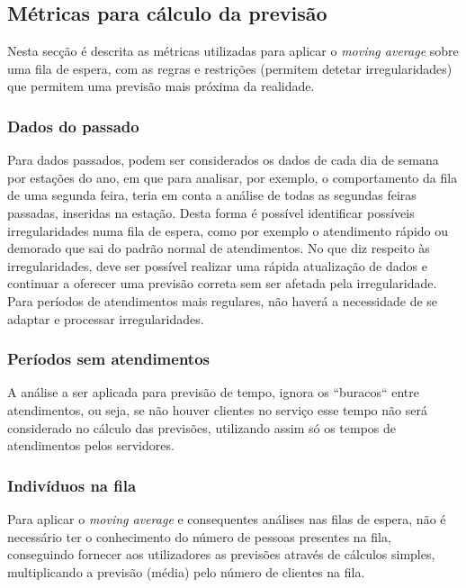 \subsection{Métricas para cálculo da previsão}

Nesta secção é descrita as métricas utilizadas para aplicar o \textit{moving average} sobre uma fila de espera, com as regras e restrições (permitem detetar irregularidades) que permitem uma previsão mais próxima da realidade. 

\subsubsection{Dados do passado}
Para dados passados, podem ser considerados os dados de cada dia de semana por estações do ano, em que para analisar, por exemplo, o comportamento da fila de uma segunda feira, teria em conta a análise de todas as segundas feiras passadas, inseridas na estação. Desta forma é possível identificar possíveis irregularidades numa fila de espera, como por exemplo o atendimento rápido ou demorado que sai do padrão normal de atendimentos. No que diz respeito às irregularidades, deve ser possível realizar uma rápida atualização de dados e continuar a oferecer uma previsão correta sem ser afetada pela irregularidade.	
Para períodos de atendimentos mais regulares, não haverá a necessidade de se adaptar e processar irregularidades.

\subsubsection{Períodos sem atendimentos}
A análise a ser aplicada para previsão de tempo, ignora os “buracos“ entre atendimentos, ou seja, se não houver clientes no serviço esse tempo não será considerado no cálculo das previsões, utilizando assim só os tempos de atendimentos pelos servidores.

\subsubsection{Indivíduos na fila}
Para aplicar o \textit{moving average} e consequentes análises nas filas de espera, não é necessário ter o conhecimento do número de pessoas presentes na fila, conseguindo fornecer aos utilizadores as previsões através de cálculos simples, multiplicando a previsão (média) pelo número de clientes na fila.


